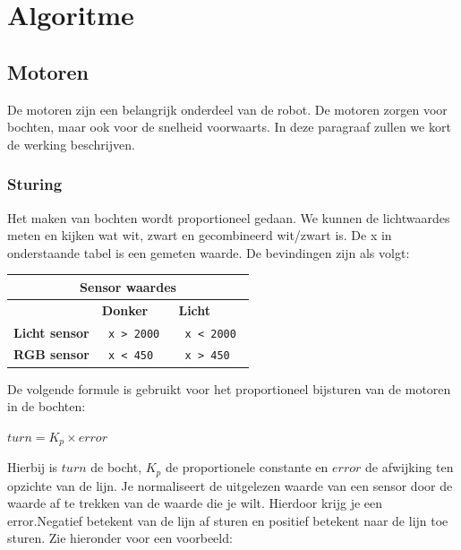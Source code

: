 \documentclass[12pt]{article}
\begin{document}
\section{Algoritme}
	\subsection{Motoren}
	De motoren zijn een belangrijk onderdeel van de robot. De motoren zorgen voor bochten, maar ook voor de snelheid voorwaarts. In deze paragraaf zullen we kort de werking beschrijven.
		\subsubsection{Sturing}
			Het maken van bochten wordt proportioneel gedaan. We kunnen de lichtwaardes meten en kijken wat wit, zwart en gecombineerd wit/zwart is. De x in onderstaande tabel is een gemeten waarde. De bevindingen zijn als volgt:
			\begin{center}
				\begin{tabular}{ | p{3cm} | p{2cm}| p{2cm} | }
					\hline
					\multicolumn{3}{|c|}{ \textbf{Sensor waardes} } \\
					\hline
					& \textbf{Donker} & \textbf{Licht} \\ 
					\hline
					\textbf{Licht sensor} & \texttt{ x > 2000 } & \texttt{ x < 2000 } \\ 
					\hline
					\textbf{RGB sensor} & \texttt{ x < 450 } & \texttt{ x > 450 } \\ 
					\hline
				\end{tabular}
			\end{center}
		De volgende formule is gebruikt voor het proportioneel bijsturen van de motoren in de bochten:
		\begin{center}
			\Large $turn = K_{p} \times error$
		\end{center}
		Hierbij is $turn$ de bocht, $K_{p}$ de proportionele constante en $error$ de afwijking ten opzichte van de lijn.
		Je normaliseert de uitgelezen waarde van een sensor door de waarde af te trekken van de waarde die je wilt. Hierdoor krijg je een error.\newpage Negatief betekent van de lijn af sturen en positief betekent naar de lijn toe sturen. Zie hieronder voor een voorbeeld:
\end{document}
